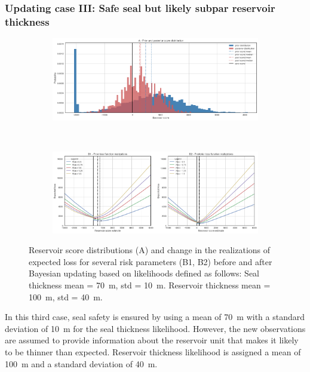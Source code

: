				\subsubsection{Updating case III: Safe seal but likely subpar reservoir thickness}
				\begin{figure}[h]
					\begin{subfigure}{1\textwidth}
						\centering
						\includegraphics[width=1\linewidth]{Figures/update_smallres2.png}
					\end{subfigure}%
					\\
					\begin{subfigure}{1\textwidth}
						\centering
						\includegraphics[width=1\linewidth]{Figures/update_smallres3.png}
					\end{subfigure}
					\caption{Reservoir score distributions (A) and change in the realizations of expected loss for several risk parameters (B1, B2) before and after Bayesian updating based on likelihoods defined as follows: Seal thickness mean = 70~m, std = 10~m. Reservoir thickness mean = 100~m, std = 40~m.}
					\label{fig:update_smallres2_3}
				\end{figure}
				In this third case, seal safety is ensured by using a mean of 70~m with a standard deviation of 10~m for the seal thickness likelihood. However, the new observations are assumed to provide information about the reservoir unit that makes it likely to be thinner than expected. Reservoir thickness likelihood is assigned a mean of 100~m and a standard deviation of 40~m.\\				
